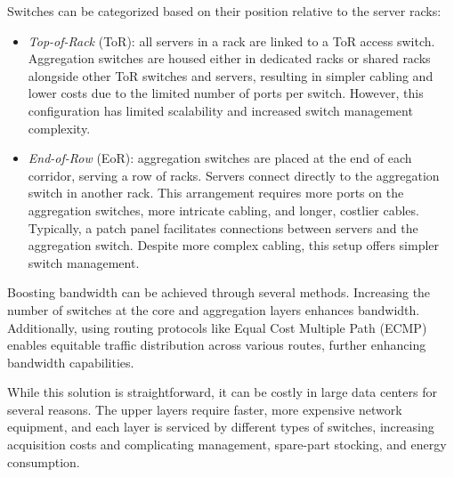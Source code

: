 Switches can be categorized based on their position relative to the server racks:
\begin{itemize}
    \item \textit{Top-of-Rack} (ToR): all servers in a rack are linked to a ToR access switch. 
        Aggregation switches are housed either in dedicated racks or shared racks alongside other ToR switches and servers, resulting in simpler cabling and lower costs due to the limited number of ports per switch. 
        However, this configuration has limited scalability and increased switch management complexity.
    \item \textit{End-of-Row} (EoR): aggregation switches are placed at the end of each corridor, serving a row of racks. 
        Servers connect directly to the aggregation switch in another rack. 
        This arrangement requires more ports on the aggregation switches, more intricate cabling, and longer, costlier cables. 
        Typically, a patch panel facilitates connections between servers and the aggregation switch. 
        Despite more complex cabling, this setup offers simpler switch management.
\end{itemize}
Boosting bandwidth can be achieved through several methods. 
Increasing the number of switches at the core and aggregation layers enhances bandwidth. 
Additionally, using routing protocols like Equal Cost Multiple Path (ECMP) enables equitable traffic distribution across various routes, further enhancing bandwidth capabilities.

While this solution is straightforward, it can be costly in large data centers for several reasons. 
The upper layers require faster, more expensive network equipment, and each layer is serviced by different types of switches, increasing acquisition costs and complicating management, spare-part stocking, and energy consumption.

